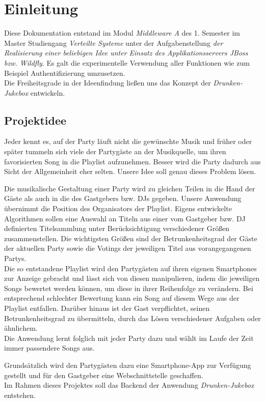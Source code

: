\section{Einleitung}
Diese Dokumentation entstand im Modul\textit{ Middleware A} des 1. Semester im Master Studiengang \textit{Verteilte Systeme} unter der Aufgabenstellung \textit{der Realisierung einer beliebigen Idee unter Einsatz des Applikationsservers JBoss bzw. Wildfly}. Es galt die experimentelle Verwendung aller Funktionen wie zum Beispiel Authentifizierung umzusetzen.\\
Die Freiheitsgrade in der Ideenfindung ließen uns das Konzept der \textit{Drunken-Jukebox} entwickeln.

\subsection{Projektidee}
Jeder kennt es, auf der Party läuft nicht die gewünschte Musik und früher oder später tummeln sich viele der Partygäste an der Musikquelle, um ihren favorisierten Song in die Playlist aufzunehmen. Besser wird die Party dadurch aus Sicht der Allgemeinheit eher selten. Unsere Idee soll genau dieses Problem lösen.

Die musikalische Gestaltung einer Party wird zu gleichen Teilen in die Hand der Gäste als auch in die des Gastgebers bzw. DJs gegeben. Unsere Anwendung übernimmt die Position des Organisators der Playlist. Eigens entwickelte Algorithmen sollen eine Auswahl an Titeln aus einer vom Gastgeber bzw. DJ definierten Titelsammlung unter Berücksichtigung verschiedener Größen zusammenstellen. Die wichtigsten Größen sind der Betrunkenheitsgrad der Gäste der aktuellen Party sowie die Votings der jeweiligen Titel aus vorangegangenen Partys.\\
Die so entstandene Playlist wird den Partygästen auf ihren eigenen Smartphones zur Anzeige gebracht und lässt sich von diesen manipulieren, indem die jeweiligen Songs bewertet werden können, um diese in ihrer Reihenfolge zu verändern. Bei entsprechend schlechter Bewertung kann ein Song auf diesem Wege aus der Playlist entfallen. Darüber hinaus ist der Gast verpflichtet, seinen Betrunkenheitsgrad zu übermitteln, durch das Lösen verschiedener Aufgaben oder ähnlichem.\\
Die Anwendung lernt folglich mit jeder Party dazu und wählt im Laufe der Zeit immer passendere Songs aus. 

Grundsätzlich wird den Partygästen dazu eine Smartphone-App zur Verfügung gestellt und für den Gastgeber eine Webschnittstelle geschaffen.\\
Im Rahmen dieses Projektes soll das Backend der Anwendung \textit{Drunken-Jukebox} entstehen. 